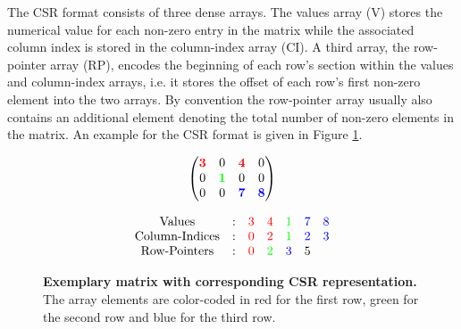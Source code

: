 \documentclass{article}
\begin{document}
    The CSR format consists of three dense arrays. The values array (V) stores the numerical value for each non-zero entry in the matrix while the associated column index is stored in the column-index array (CI). A third array, the row-pointer array (RP), encodes the beginning of each row's section within the values and column-index arrays, i.e. it stores the offset of each row's first non-zero element into the two arrays. By convention the row-pointer array usually also contains an additional element denoting the total number of non-zero elements in the matrix. An example for the CSR format is given in Figure \ref{fig:csr_example}.

    \begin{figure}[ht]
      \centering
      \begin{minipage}{0.4\textwidth}
        \centering
        $$
        \begin{pmatrix}
          \color{red}{\bm{3}} &                     0 &  \color{red}{\bm{4}} &                    0 \\
                            0 & \color{green}{\bm{1}} &                    0 &                    0 \\
                            0 &                     0 & \color{blue}{\bm{7}} & \color{blue}{\bm{8}} \\
        \end{pmatrix}
        $$
      \end{minipage}
      \begin{minipage}{0.4\textwidth}
        \centering
        $$
        \begin{matrix}
          \text{Values}  & : & \color{red}{3} &   \color{red}{4} & \color{green}{1} & \color{blue}{7} & \color{blue}{8} \\
          \text{Column-Indices} & : & \color{red}{0} &   \color{red}{2} & \color{green}{1} & \color{blue}{2} & \color{blue}{3} \\
          \text{Row-Pointers} & : & \color{red}{0} & \color{green}{2} &  \color{blue}{3} &               5 &                 \\
        \end{matrix}
        $$
      \end{minipage}
      \caption[Exemplary matrix with corresponding CSR representation.]{\textbf{Exemplary matrix with corresponding CSR representation.} The array elements are color-coded in red for the first row, green for the second row and blue for the third row.}
      \label{fig:csr_example}
    \end{figure}
\end{document}

